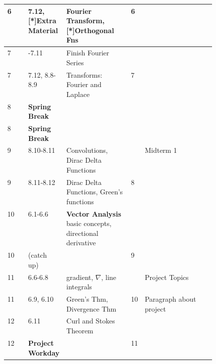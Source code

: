 \documentclass[12pt]{article}
\begin{document}
{\begin{table}[h]
\begin{tabular}{l|l|p{0.18\linewidth}|p{0.31\linewidth}|l|l}
6             &         & 7.12, [*]Extra Material &Fourier Transform, [*]Orthogonal Fns & 6 &                 \\ \hline 
7             &         & -7.11 & Finish Fourier Series & &                  \\  
7             &         & 7.12, 8.8-8.9  & Transforms: Fourier and Laplace & 7 &                 \\ \hline 
8              &         & \textbf{Spring Break} &  &  &                   \\ 
8              &         & \textbf{Spring Break} &  &  &                   \\ \hline
9             &        & 8.10-8.11 & Convolutions, Dirac Delta Functions  &  & Midterm 1                  \\  
9             &       & 8.11-8.12 & Dirac Delta Functions, Green's functions & 8 &                   \\ \hline  
10             &        & 6.1-6.6 & \textbf{Vector Analysis} basic concepts, directional derivative &  &                  \\ 
10             &         &(catch up) & & 9 &                   \\ \hline 
11             &       &6.6-6.8 & gradient, $\nabla$, line integrals &  &  Project Topics                 \\ 
11             &        &6.9, 6.10 & Green's Thm, Divergence Thm & 10 &  Paragraph about project                 \\ \hline 
12             &        &  6.11 & Curl and Stokes Theorem &  &                \\ 
12             &        & \textbf{Project Workday} &  & 11 &                 \\ \hline 

\end{tabular}
\end{table}}
\end{document}
